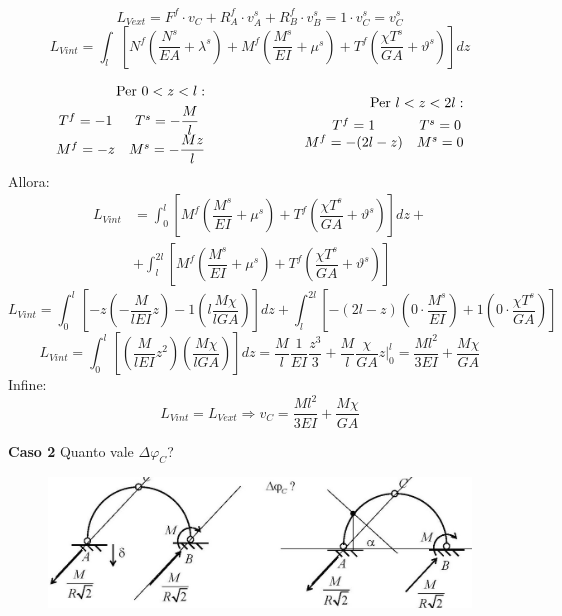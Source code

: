 \documentclass{article}
\begin{document}
\begin{adjustwidth}{2in}{}
		\[L_{Vext} = F^f \cdot v_C + R_A^f \cdot v_A^s + R_B^f \cdot v_B^s = 1 \cdot v_C^s = v_C^s\]
		\[
		L_{Vint} = \int_{l} \left[  N^f \left( \dfrac{N^s}{EA} +\lambda^s \right)  + M^f\left( \dfrac{M^s}{EI} +\mu^s \right) + T^f\left( \dfrac{\chi T^s}{GA} +\vartheta^s \right) \right] dz 
		\]
		 
		\[ \begin{split}
		\text{Per} ~ 0<z<l: & \\
		\begin{matrix}
			T^f = -1 & T^s = -\dfrac{M}{l} \\
			M^f = -z & M^s = -\dfrac{Mz}{l}
		\end{matrix}
	\end{split}
		\hspace{2.5cm}
		\begin{split}
			\text{Per} ~ l<z<2l: & \\
		\begin{matrix}
			T^f = 1 & T^s = 0 \\
			M^f = -(2l-z) & M^s = 0
		\end{matrix}
		\end{split}
		\]
		Allora:
		\[ \begin{split}
		L_{Vint} & = \int_{0}^{l} \left[ M^f\left( \dfrac{M^s}{EI} +\mu^s \right) + T^f\left( \dfrac{\chi T^s}{GA} +\vartheta^s \right) \right] dz + \\
		& + \int_{l}^{2l} \left[ M^f\left( \dfrac{M^s}{EI} +\mu^s \right) + T^f\left( \dfrac{\chi T^s}{GA} +\vartheta^s \right) \right]
		\end{split}
		\]
		\[
		L_{Vint} = \int_{0}^{l} \left[ -z\left( -\dfrac{M}{lEI}z \right) -1\left( l\dfrac{M \chi}{lGA} \right) \right] dz + \int_{l}^{2l} \left[-(2l-z)\left( 0\cdot\dfrac{M^s}{EI} \right) + 1\left( 0 \cdot \dfrac{\chi T^s}{GA} \right) \right]
		\]
		\[
		L_{Vint} = \int_{0}^{l} \left[ \left( \dfrac{M}{lEI}z^2 \right) \left( \dfrac{M \chi}{lGA} \right) \right] dz = \dfrac{M}{l}\dfrac{1}{EI}\dfrac{z^3}{3} + \dfrac{M}{l}\dfrac{\chi}{GA}z\Bigr\rvert_{0}^{l} = \dfrac{Ml^2}{3EI} + \dfrac{M\chi}{GA}
		\]
		Infine:
		\[L_{Vint} = L_{Vext} \Rightarrow v_C = \dfrac{Ml^2}{3EI} + \dfrac{M\chi}{GA}\]

\textbf{Caso 2}	\newline
		Quanto vale $\Delta\varphi_C$?

\begin{figure}[H]
	\centering
	\includegraphics[width=0.7\linewidth]{"immagini/1.PARTE8_Pagina_67 (2)"}	
\end{figure}


\end{adjustwidth}
\end{document}
